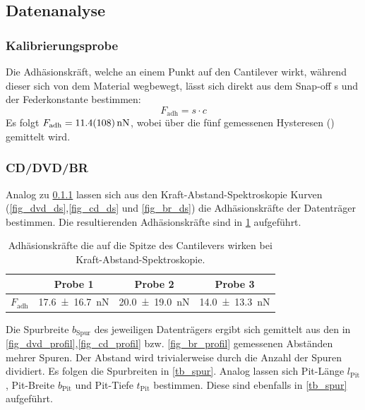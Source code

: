 \documentclass[
	a4paper,
	12pt,
	pagesize,
	ngerman
]{scrartcl}
\begin{document}
	\subsection{Datenanalyse}
	\subsubsection{Kalibrierungsprobe} \label{sss_kali}
	Die Adhäsionskräft, welche an einem Punkt auf den Cantilever wirkt, während dieser sich von dem Material wegbewegt, lässt sich direkt aus dem Snap-off s und der Federkonstante bestimmen:
	\begin{equation}
			\label{eq_adh}
			F_\text{adh} = s \cdot c
	\end{equation}
	Es folgt $F_\text{adh}=\SI{11.4+-10.8}{nN}$, wobei über die fünf gemessenen Hysteresen () gemittelt wird.

	\subsubsection{CD/DVD/BR}
	Analog zu \cref{sss_kali} lassen sich aus den Kraft-Abstand-Spektroskopie Kurven (\cref{fig_dvd_ds},\cref{fig_cd_ds} und \cref{fig_br_ds}) die Adhäsionskräfte der Datenträger bestimmen.
	Die resultierenden Adhäsionskräfte sind in \cref{tb_adh} aufgeführt.

\begin{table}[H]
		\centering
		\begin{tabular}{ c | c | c | c }
			 & Probe 1 & Probe 2 & Probe 3\\ \hline
			$F_\text{adh}$ & \SI{17.6+-16.7}{nN} & \SI{20.0+-19.0}{nN} &\SI{14.0+-13.3}{nN} \\
		\end{tabular}
		\caption{Adhäsionskräfte die auf die Spitze des Cantilevers wirken bei Kraft-Abstand-Spektroskopie.}
		\label{tb_adh}
	\end{table}

	Die Spurbreite $b_\text{Spur}$ des jeweiligen Datenträgers ergibt sich gemittelt aus den in \cref{fig_dvd_profil},\cref{fig_cd_profil} bzw. \cref{fig_br_profil} gemessenen Abständen mehrer Spuren.
	Der Abstand wird trivialerweise durch die Anzahl der Spuren dividiert.
	Es folgen die Spurbreiten in \cref{tb_spur}.
	Analog lassen sich Pit-Länge $l_\text{Pit}$ , Pit-Breite $b_\text{Pit}$ und Pit-Tiefe $t_\text{Pit}$ bestimmen.
	Diese sind ebenfalls in \cref{tb_spur} aufgeführt.
\end{document}
